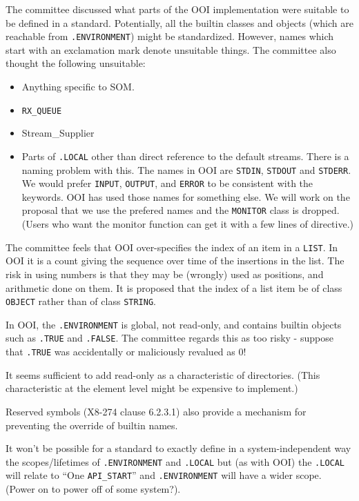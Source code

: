 The committee discussed what parts of the OOI implementation were
suitable to be defined in a standard. Potentially, all the builtin
classes and objects (which are reachable from \texttt{.ENVIRONMENT})
might be standardized. However, names which start with an exclamation
mark denote unsuitable things. The committee also thought the following
unsuitable:

\begin{itemize}
\tightlist
\item
  Anything specific to SOM.
\item
  \texttt{RX\_QUEUE}
\item
  Stream\_Supplier
\item
  Parts of \texttt{.LOCAL} other than direct reference to the default
  streams. There is a naming problem with this. The names in OOI are
  \texttt{STDIN}, \texttt{STDOUT} and \texttt{STDERR}. We would prefer
  \texttt{INPUT}, \texttt{OUTPUT}, and \texttt{ERROR} to be consistent
  with the keywords. OOI has used those names for something else. We
  will work on the proposal that we use the prefered names and the
  \texttt{MONITOR} class is dropped. (Users who want the monitor
  function can get it with a few lines of directive.)
\end{itemize}

The committee feels that OOI over-specifies the index of an item in a
\texttt{LIST}. In OOI it is a count giving the sequence over time of the
insertions in the list. The risk in using numbers is that they may be
(wrongly) used as positions, and arithmetic done on them. It is proposed
that the index of a list item be of class \texttt{OBJECT} rather than of
class \texttt{STRING}.

In OOI, the \texttt{.ENVIRONMENT} is global, not read-only, and contains
builtin objects such as \texttt{.TRUE} and \texttt{.FALSE}. The
committee regards this as too risky - suppose that \texttt{.TRUE} was
accidentally or maliciously revalued as 0!

It seems sufficient to add read-only as a characteristic of directories.
(This characteristic at the element level might be expensive to
implement.)

Reserved symbols (X8-274 clause 6.2.3.1) also provide a mechanism for
preventing the override of builtin names.

It won't be possible for a standard to exactly define in a
system-independent way the scopes/lifetimes of \texttt{.ENVIRONMENT} and
\texttt{.LOCAL} but (as with OOI) the \texttt{.LOCAL} will relate to
``One \texttt{API\_START}'' and \texttt{.ENVIRONMENT} will have a wider
scope. (Power on to power off of some system?).

